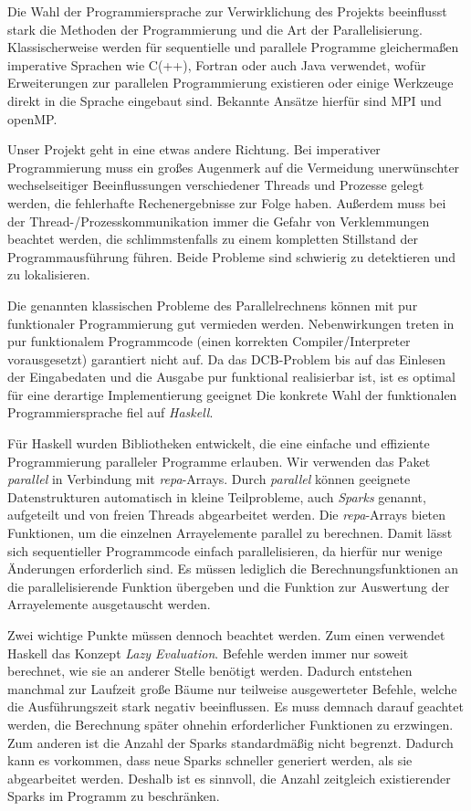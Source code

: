 \documentclass[a4paper]{scrartcl}
\newcommand{\en}[1]{\selectlanguage{USenglish}#1\selectlanguage{ngerman}}
\begin{document}
Die Wahl der Programmiersprache zur Verwirklichung des Projekts beeinflusst stark die Methoden der Programmierung und die Art der Parallelisierung. Klassischerweise werden für sequentielle und parallele Programme gleichermaßen imperative Sprachen wie C(++), Fortran oder auch Java verwendet, wofür Erweiterungen zur parallelen Programmierung existieren oder einige Werkzeuge direkt in die Sprache eingebaut sind. Bekannte Ansätze hierfür sind MPI und openMP. \par
Unser Projekt geht in eine etwas andere Richtung. Bei imperativer Programmierung muss ein großes Augenmerk auf die Vermeidung unerwünschter wechselseitiger Beeinflussungen verschiedener Threads und Prozesse gelegt werden, die fehlerhafte Rechenergebnisse zur Folge haben. Außerdem muss bei der Thread-/Prozesskommunikation immer die Gefahr von Verklemmungen beachtet werden, die schlimmstenfalls zu einem kompletten Stillstand der Programmausführung führen. Beide Probleme sind schwierig zu detektieren und zu lokalisieren.\par
Die genannten klassischen Probleme des Parallelrechnens können mit pur funktionaler Programmierung gut vermieden werden. Nebenwirkungen treten in pur funktionalem Programmcode (einen korrekten Compiler/Interpreter vorausgesetzt) garantiert nicht auf. Da das DCB-Problem bis auf das Einlesen der Eingabedaten und die Ausgabe pur funktional realisierbar ist, ist es optimal für eine derartige Implementierung geeignet Die konkrete Wahl der funktionalen Programmiersprache fiel auf \emph{Haskell}. \par
\medskip
Für Haskell wurden Bibliotheken entwickelt, die eine einfache und effiziente Programmierung paralleler Programme erlauben. Wir verwenden das Paket \emph{parallel} in Verbindung mit \emph{repa}-Arrays. Durch \emph{parallel} können geeignete Datenstrukturen automatisch in kleine Teilprobleme, auch \emph{Sparks} genannt, aufgeteilt und von freien Threads abgearbeitet werden. Die \emph{repa}-Arrays bieten Funktionen, um die einzelnen Arrayelemente parallel zu berechnen. Damit lässt sich sequentieller Programmcode einfach parallelisieren, da hierfür nur wenige Änderungen erforderlich sind. Es müssen lediglich die Berechnungsfunktionen an die parallelisierende Funktion übergeben und die Funktion zur Auswertung der Arrayelemente ausgetauscht werden. \par
Zwei wichtige Punkte müssen dennoch beachtet werden. Zum einen verwendet Haskell das Konzept \emph{\en{Lazy Evaluation}}. Befehle werden immer nur soweit berechnet, wie sie an anderer Stelle benötigt werden. Dadurch entstehen manchmal zur Laufzeit große Bäume nur teilweise ausgewerteter Befehle, welche die Ausführungszeit stark negativ beeinflussen. Es muss demnach darauf geachtet werden, die Berechnung später ohnehin erforderlicher Funktionen zu erzwingen. Zum anderen ist die Anzahl der Sparks standardmäßig nicht begrenzt. Dadurch kann es vorkommen, dass neue Sparks schneller generiert werden, als sie abgearbeitet werden. Deshalb ist es sinnvoll, die Anzahl zeitgleich existierender Sparks im Programm zu beschränken.
\end{document}
